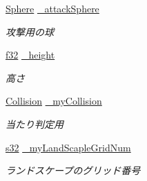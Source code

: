 \begin{DoxyCompactItemize}
\hyperlink{struct_sphere}{Sphere} \hyperlink{class_man_a904eaf8909829ca908e6c2fad0e4f0b1}{\-\_\-attack\-Sphere}
\begin{DoxyCompactList}\small\item\em 攻撃用の球 \end{DoxyCompactList}\item 
\hyperlink{_main_8h_a5f6906312a689f27d70e9d086649d3fd}{f32} \hyperlink{class_man_a2bf56500306d81e049788a83604cd723}{\-\_\-height}
\begin{DoxyCompactList}\small\item\em 高さ \end{DoxyCompactList}\item 
\hyperlink{class_collision}{Collision} \hyperlink{class_man_af9bbaacbb75df8c52d44133df86b3778}{\-\_\-my\-Collision}
\begin{DoxyCompactList}\small\item\em 当たり判定用 \end{DoxyCompactList}\item 
\hyperlink{_main_8h_a0ce6887c26c1c49ad3be5710dd42bfd6}{s32} \hyperlink{class_man_ab8554a2b8918e3da6067fbf5ec4d2585}{\-\_\-my\-Land\-Scaple\-Grid\-Num}
\begin{DoxyCompactList}\small\item\em ランドスケープのグリッド番号 \end{DoxyCompactList}\end{DoxyCompactItemize}



